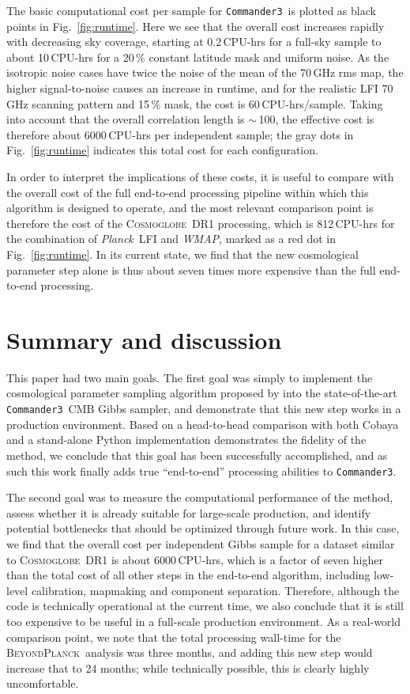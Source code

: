 \documentclass[twocolumn]{../common/aa}
\def\WMAP{\emph{WMAP}}
\def\Planck{\emph{Planck}}
\def\commanderthree{\texttt{Commander3}}
\newcommand{\BP}{\textsc{BeyondPlanck}}
\newcommand{\cosmoglobe}{\textsc{Cosmoglobe}}
\begin{document}
The basic computational cost per sample for \commanderthree\ is plotted as black points in Fig.~\ref{fig:runtime}. Here we see that the overall cost increases rapidly with decreasing sky coverage, starting at 0.2\,CPU-hrs for a full-sky sample to about 10\,CPU-hrs for a 20\,\% constant latitude mask and uniform noise. As the isotropic noise cases have twice the noise of the mean of the 70\,GHz rms map, the higher signal-to-noise causes an increase in runtime, and for the realistic LFI 70\,GHz scanning pattern and 15\,\% mask, the cost is 60\,CPU-hrs/sample. Taking into account that the overall correlation length is $\sim$\,100, the effective cost is therefore about 6000\,CPU-hrs per independent sample; the gray dots in Fig.~\ref{fig:runtime} indicates this total cost for each configuration.

In order to interpret the implications of these costs, it is useful to compare with the overall cost of the full end-to-end processing pipeline within which this algorithm is designed to operate, and the most relevant comparison point is therefore the cost of the \cosmoglobe\ DR1 processing, which is 812\,CPU-hrs for the combination of \Planck\ LFI and \WMAP, marked as a red dot in Fig.~\ref{fig:runtime}. In its current state, we find that the new cosmological parameter step alone is thus about seven times more expensive than the full end-to-end processing. 

\section{Summary and discussion}
\label{sec:conclusions}

This paper had two main goals. The first goal was simply to implement the cosmological parameter sampling algorithm proposed by \citet{racine:2016} into the state-of-the-art \commanderthree\ CMB Gibbs sampler, and demonstrate that this new step works in a production environment. Based on a head-to-head comparison with both Cobaya and a stand-alone Python implementation demonstrates the fidelity of the method, we conclude that this goal has been successfully accomplished, and as such this work finally adds true ``end-to-end'' processing abilities to \commanderthree. 

The second goal was to measure the computational performance of the method, assess whether it is already suitable for large-scale production, and identify potential bottlenecks that should be optimized through future work. In this case, we find that the overall cost per independent Gibbs sample for a dataset similar to \cosmoglobe\ DR1 is about 6000\,CPU-hrs, which is a factor of seven higher than the total cost of all other steps in the end-to-end algorithm, including low-level calibration, mapmaking and component separation. Therefore, although the code is technically operational at the current time, we also conclude that it is still too expensive to be useful in a full-scale production environment. As a real-world comparison point, we note that the total processing wall-time for the \BP\ analysis was three months, and adding this new step would increase that to 24 months; while technically possible, this is clearly highly uncomfortable.
\end{document}
